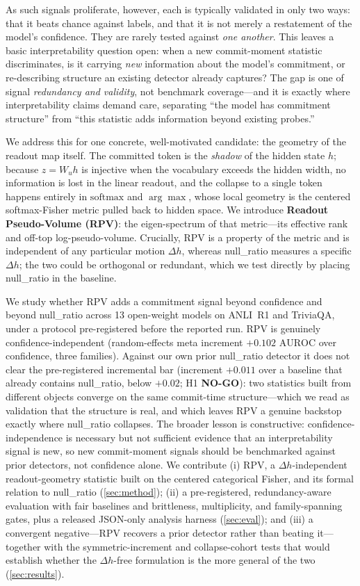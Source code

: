 \documentclass[10pt, letterpaper]{article}
\newcommand{\auroc}{\text{AUROC}}
\newcommand{\Wu}{W_{u}}
\newcommand{\nullr}{\textsf{null\_ratio}}
\begin{document}
As such signals proliferate, however, each is typically validated in
only two ways: that it beats chance against labels, and that it is not
merely a restatement of the model's confidence. They are rarely tested
against \emph{one another}. This leaves a basic interpretability
question open: when a new commit-moment statistic discriminates, is it
carrying \emph{new} information about the model's commitment, or
re-describing structure an existing detector already captures? The gap
is one of signal \emph{redundancy and validity}, not benchmark
coverage---and it is exactly where interpretability claims demand
care, separating ``the model has commitment structure'' from ``this
statistic adds information beyond existing probes.''

We address this for one concrete, well-motivated candidate: the
geometry of the readout map itself. The committed token is the
\emph{shadow} of the hidden state $h$; because $z=\Wu h$ is injective
when the vocabulary exceeds the hidden width, no information is lost in
the linear readout, and the collapse to a single token happens entirely
in $\mathrm{softmax}$ and $\arg\max$, whose local geometry is the
centered softmax-Fisher metric pulled back to hidden space. We
introduce \textbf{Readout Pseudo-Volume (RPV)}: the eigen-spectrum of
that metric---its effective rank and off-top log-pseudo-volume.
Crucially, RPV is a property of the metric and is independent of any
particular motion $\Delta h$, whereas \nullr{} measures a specific
$\Delta h$; the two could be orthogonal or redundant, which we test
directly by placing \nullr{} in the baseline.

We study whether RPV adds a commitment signal beyond confidence and
beyond \nullr{} across 13 open-weight models on ANLI~R1 and TriviaQA,
under a protocol pre-registered before the reported run. RPV is
genuinely confidence-independent (random-effects meta increment
$+0.102$ $\auroc$ over confidence, three families). Against our own
prior \nullr{} detector it does not clear the pre-registered
incremental bar (increment $+0.011$ over a baseline that already
contains \nullr{}, below $+0.02$; H1 \textbf{NO-GO}): two statistics
built from different objects converge on the same commit-time
structure---which we read as validation that the structure is real, and
which leaves RPV a genuine backstop exactly where \nullr{} collapses.
The broader lesson is constructive: confidence-independence is necessary
but not sufficient evidence that an interpretability signal is new, so
new commit-moment signals should be benchmarked against prior detectors,
not confidence alone. We contribute (i) RPV, a $\Delta h$-independent
readout-geometry statistic built on the centered categorical Fisher, and
its formal relation to \nullr{} (\cref{sec:method}); (ii) a
pre-registered, redundancy-aware evaluation with fair baselines and
brittleness, multiplicity, and family-spanning gates, plus a released
JSON-only analysis harness (\cref{sec:eval}); and (iii) a convergent
negative---RPV recovers a prior detector rather than beating it---together
with the symmetric-increment and collapse-cohort tests that would
establish whether the $\Delta h$-free formulation is the more general of
the two (\cref{sec:results}).
\end{document}
